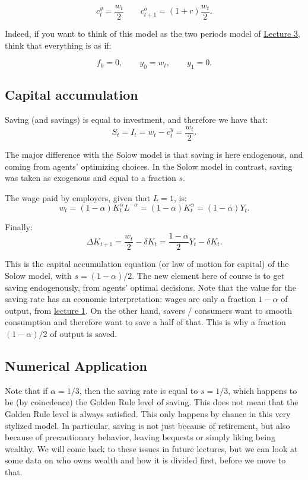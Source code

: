 \documentclass[]{book}
\theoremstyle{definition}
\theoremstyle{definition}
\theoremstyle{definition}
\theoremstyle{remark}
\begin{document}
\[c_{t}^{y}=\frac{w_{t}}{2}\qquad c_{t+1}^{o}=(1+r)\frac{w_{t}}{2}.\]

Indeed, if you want to think of this model as the two periods model of
\protect\hyperlink{two-period}{Lecture 3}, think that everything is as
if:

\[f_{0}=0,\qquad y_{0}=w_{t},\qquad y_{1}=0.\]

\subsection{Capital accumulation}\label{capital-accumulation}

Saving (and savings) is equal to investment, and therefore we have that:
\[S_t = I_t = w_{t}-c_{t}^{y}=\frac{w_{t}}{2}.\]

The major difference with the Solow model is that saving is here
endogenous, and coming from agents' optimizing choices. In the Solow
model in contrast, saving was taken as exogenous and equal to a fraction
\(s\).

The wage paid by employers, given that \(L=1\), is:
\[w_{t}=(1-\alpha)K_{t}^{\alpha}L^{-\alpha}=(1-\alpha)K_{t}^{\alpha} = (1-\alpha)Y_t.\]

Finally:
\[\Delta K_{t+1}=\frac{w_{t}}{2}-\delta K_{t} = \frac{1-\alpha}{2}Y_t-\delta K_t.\]

This is the capital accumulation equation (or law of motion for capital)
of the Solow model, with \(s = (1-\alpha)/2\). The new element here of
course is to get saving endogenously, from agents' optimal decisions.
Note that the value for the saving rate has an economic interpretation:
wages are only a fraction \(1-\alpha\) of output, from
\protect\hyperlink{intro-cobb}{lecture 1}. On the other hand, savers /
consumers want to smooth consumption and therefore want to save a half
of that. This is why a fraction \((1-\alpha)/2\) of output is saved.

\subsection{Numerical Application}\label{numerical-application}

Note that if \(\alpha=1/3\), then the saving rate is equal to
\(s = 1/3\), which happens to be (by coincdence) the Golden Rule level
of saving. This does not mean that the Golden Rule level is always
satisfied. This only happens by chance in this very stylized model. In
particular, saving is not just because of retirement, but also because
of precautionary behavior, leaving bequests or simply liking being
wealthy. We will come back to these issues in future lectures, but we
can look at some data on who owns wealth and how it is divided first,
before we move to that.
\end{document}
